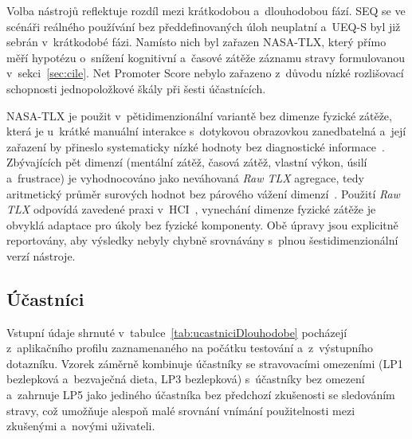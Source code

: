 Volba nástrojů reflektuje rozdíl mezi krátkodobou a~dlouhodobou fází.
SEQ se ve scénáři reálného používání bez předdefinovaných úloh neuplatní a~UEQ-S byl již sebrán v~krátkodobé fázi.
Namísto nich byl zařazen NASA-TLX, který přímo měří hypotézu o~snížení kognitivní a~časové zátěže záznamu stravy formulovanou v~sekci~\ref{sec:cile}.
Net Promoter Score nebylo zařazeno z~důvodu nízké rozlišovací schopnosti jednopoložkové škály při šesti účastnících.

NASA-TLX je použit v~pětidimenzionální variantě bez dimenze fyzické zátěže, která je u~krátké manuální interakce s~dotykovou obrazovkou zanedbatelná a~její zařazení by přineslo systematicky nízké hodnoty bez diagnostické informace~\cite{hart1988nasaTlx}.
Zbývajících pět dimenzí (mentální zátěž, časová zátěž, vlastní výkon, úsilí a~frustrace) je vyhodnocováno jako neváhovaná \emph{Raw TLX} agregace, tedy aritmetický průměr surových hodnot bez párového vážení dimenzí~\cite{hart2006nasaTlx20Years}.
Použití \emph{Raw TLX} odpovídá zavedené praxi v~HCI~\cite{hart2006nasaTlx20Years}, vynechání dimenze fyzické zátěže je obvyklá adaptace pro úkoly bez fyzické komponenty.
Obě úpravy jsou explicitně reportovány, aby výsledky nebyly chybně srovnávány s~plnou šestidimenzionální verzí nástroje.

\subsection{Účastníci}
\label{subsec:ucastniciDlouhodobe}

Vstupní údaje shrnuté v~tabulce~\ref{tab:ucastniciDlouhodobe} pocházejí z~aplikačního profilu zaznamenaného na počátku testování a~z~výstupního dotazníku. Vzorek záměrně kombinuje účastníky se stravovacími omezeními (LP1 bezlepková a~bezvaječná dieta, LP3 bezlepková) s~účastníky bez omezení a~zahrnuje LP5 jako jediného účastníka bez předchozí zkušenosti se sledováním stravy, což umožňuje alespoň malé srovnání vnímání použitelnosti mezi zkušenými a~novými uživateli.

